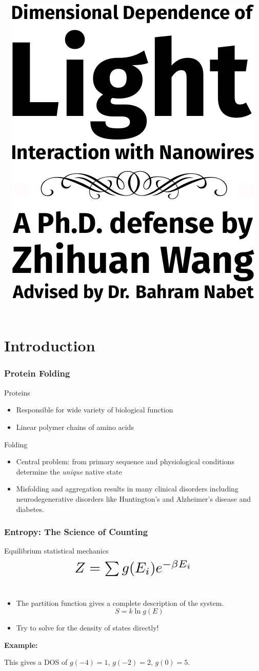 \documentclass[handout]{beamer} %
\title[Protein Folding with Implicit Crowders]
{
\includegraphics[height=.7\textheight]{block_text_creation/text_block.pdf}
}
\date{}
\begin{document}
\begin{frame}
	\thispagestyle{empty}
	\titlepage
\end{frame}


\section{Introduction}

\setcounter{framenumber}{0}

\begin{frame}
	\frametitle{Protein Folding}
	\begin{block}{Proteins}
	\begin{itemize}
	\item Responsible for wide variety of biological function
	\item Linear polymer chains of amino acids
	\end{itemize}	
	\end{block}
	
	\begin{block}{Folding}
	\begin{itemize}
	\item Central problem: from primary sequence and physiological conditions determine the \emph{unique} native state
	\item Misfolding and aggregation results in many clinical disorders including neurodegenerative disorders like Huntington's and Alzheimer's disease and diabetes.
	\end{itemize}	
	\end{block}

\end{frame}

\begin{frame}
	\frametitle{Entropy: The Science of Counting}

\begin{block}{Equilibrium statistical mechanics}
\[
\scalebox{2.0}{$
Z = \sum g(E_i) e^{-\beta E_i}$} 
\] \\
\begin{itemize}
\item The partition function gives a complete description of the system.
$$S = k \ln g(E) $$
\item Try to solve for the density of states directly!
\end{itemize}
\end{block}
%
\pause
%
\textbf{Example:} \\
\begin{center}
\scalebox{.8}{\TIKZenergylevelSHORT} 
\end{center}
This gives a DOS of $g(-4)=1$, $g(-2)=2$, $g(0)=5$.

\end{frame}
\end{document}
